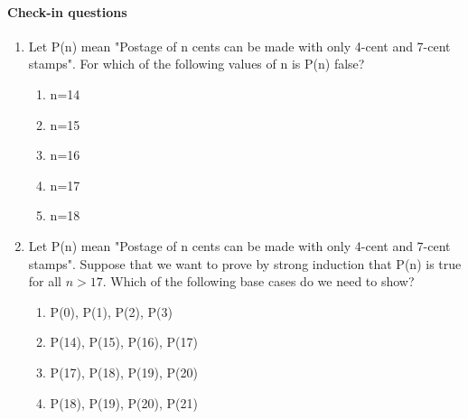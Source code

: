 \documentclass[12pt]{article}
\begin{document}
\paragraph*{Check-in questions}
\begin{enumerate}
\item Let P(n) mean "Postage of n cents can be made with only 4-cent and 7-cent stamps". For which of the following values of n is P(n) false?
\begin{enumerate}
    \item n=14
    \item n=15
    \item n=16
    \item n=17
    \item n=18
\end{enumerate}
\item Let P(n) mean "Postage of n cents can be made with only 4-cent and 7-cent stamps". Suppose that we want to prove by strong induction that P(n) is true for all $n>17$.  Which of the following base cases do we need to show? 
\begin{enumerate}
    \item P(0), P(1), P(2), P(3)
    \item P(14), P(15), P(16), P(17)
    \item P(17), P(18), P(19), P(20)
	\item P(18), P(19), P(20), P(21)

\end{enumerate}
\end{enumerate}

\pagebreak
\end{document}
